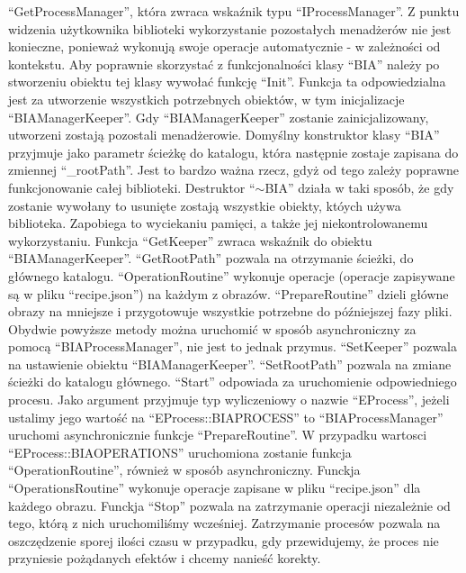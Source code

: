 \documentclass{article}
\begin{document}
{            ``GetProcessManager'', która zwraca wskaźnik typu ``IProcessManager''.
            Z punktu widzenia użytkownika biblioteki wykorzystanie pozostałych menadżerów nie jest konieczne, ponieważ wykonują swoje operacje automatycznie - w zależności od kontekstu.
            Aby poprawnie skorzystać z funkcjonalności klasy ``BIA'' należy po stworzeniu obiektu tej klasy wywołać funkcję ``Init''.
            Funkcja ta odpowiedzialna jest za utworzenie wszystkich potrzebnych obiektów, w tym inicjalizacje ``BIAManagerKeeper''.
            Gdy ``BIAManagerKeeper'' zostanie zainicjalizowany, utworzeni zostają pozostali menadżerowie.
            Domyślny konstruktor klasy ``BIA'' przyjmuje jako parametr ścieżkę do katalogu, która następnie zostaje zapisana do zmiennej ``\_rootPath''.
            Jest to bardzo ważna rzecz, gdyż od tego zależy poprawne funkcjonowanie całej biblioteki.
            Destruktor ``$\sim$BIA'' działa w taki sposób, że gdy zostanie wywołany to usunięte zostają wszystkie obiekty, któych używa biblioteka.
            Zapobiega to wyciekaniu pamięci, a także jej niekontrolowanemu wykorzystaniu.
            Funkcja ``GetKeeper'' zwraca wskaźnik do obiektu ``BIAManagerKeeper''.
            ``GetRootPath'' pozwala na otrzymanie ścieżki, do głównego katalogu.
            ``OperationRoutine'' wykonuje operacje (operacje zapisywane są w pliku 
            ``recipe.json'') na każdym z obrazów.
            ``PrepareRoutine'' dzieli główne obrazy na mniejsze i przygotowuje wszystkie potrzebne do późniejszej fazy pliki.
            Obydwie powyższe metody można uruchomić w sposób asynchroniczny za pomocą ``BIAProcessManager'', nie jest to jednak przymus.
            ``SetKeeper'' pozwala na ustawienie obiektu ``BIAManagerKeeper''.
            ``SetRootPath'' pozwala na zmiane ścieżki do katalogu głównego.
            ``Start'' odpowiada za uruchomienie odpowiedniego procesu. Jako argument przyjmuje typ wyliczeniowy o nazwie ``EProcess'', jeżeli ustalimy jego wartość na ``EProcess::BIAPROCESS'' to ``BIAProcessManager'' uruchomi asynchronicznie funkcje ``PrepareRoutine''.
            W przypadku wartosci ``EProcess::BIAOPERATIONS'' uruchomiona zostanie funkcja ``OperationRoutine'', również w sposób asynchroniczny.
            Funckja ``OperationsRoutine'' wykonuje operacje zapisane w pliku ``recipe.json'' dla każdego obrazu.
            Funckja ``Stop'' pozwala na zatrzymanie operacji niezależnie od tego, którą z nich uruchomiliśmy wcześniej.
            Zatrzymanie procesów pozwala na oszczędzenie sporej ilości czasu w przypadku, gdy przewidujemy, że proces nie przyniesie pożądanych efektów i chcemy nanieść korekty.
}
\end{document}
